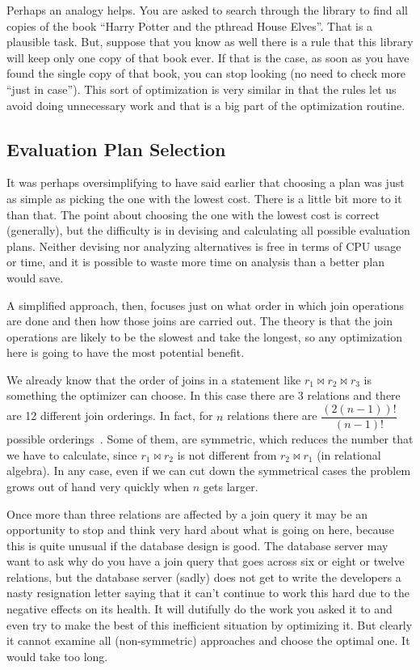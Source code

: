 \documentclass[a4paper]{report}
\begin{document}
Perhaps an analogy helps. You are asked to search through the library to find all copies of the book ``Harry Potter and the pthread House Elves''. That is a plausible task. But, suppose that you know as well there is a rule that this library will keep only one copy of that book ever. If that is the case, as soon as you have found the single copy of that book, you can stop looking (no need to check more ``just in case''). This sort of optimization is very similar in that the rules let us avoid doing unnecessary work and that is a big part of the optimization routine.

\subsection*{Evaluation Plan Selection}

It was perhaps oversimplifying to have said earlier that choosing a plan was just as simple as picking the one with the lowest cost. There is a little bit more to it than that. The point about choosing the one with the lowest cost is correct (generally), but the difficulty is in devising and calculating all possible evaluation plans. Neither devising nor analyzing alternatives is free in terms of CPU usage or time, and it is possible to waste more time on analysis than a better plan would save. 

A simplified approach, then, focuses just on what order in which join operations are done and then how those joins are carried out. The theory is that the join operations are likely to be the slowest and take the longest, so any optimization here is going to have the most potential benefit.

We already know that the order of joins in a statement like $r_{1} \bowtie r_{2} \bowtie r_{3}$ is something the optimizer can choose. In this case there are 3 relations and there are 12 different join orderings. In fact, for $n$ relations there are $\dfrac{(2(n-1))!}{(n-1)!}$ possible orderings~\cite{dsc}. Some of them, are symmetric, which reduces the number that we have to calculate, since $r_{1} \bowtie r_{2}$ is not different from $r_{2} \bowtie r_{1}$ (in relational algebra). In any case, even if we can cut down the symmetrical cases the problem grows out of hand very quickly when $n$ gets larger. 

Once more than three relations are affected by a join query it may be an opportunity to stop and think very hard about what is going on here, because this is quite unusual if the database design is good. The database server may want to ask why do you have a join query that goes across six or eight or twelve relations, but the database server (sadly) does not get to write the developers a nasty resignation letter saying that it can't continue to work this hard due to the negative effects on its health. It will dutifully do the work you asked it to and even try to make the best of this inefficient situation by optimizing it. But clearly it cannot examine all (non-symmetric) approaches and choose the optimal one. It would take too long.
\end{document}
